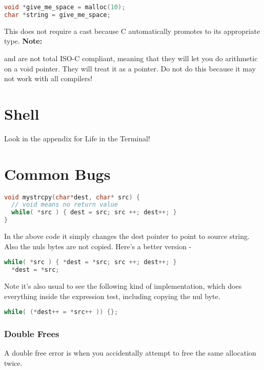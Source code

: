 \begin{lstlisting}[language=C]
void *give_me_space = malloc(10);
char *string = give_me_space;
\end{lstlisting}

This does not require a cast because C automatically promotes  to its appropriate type. \textbf{Note:}

 and  are not total ISO-C compliant, meaning that they will let you do arithmetic on a void pointer. They will treat it as a  pointer. Do not do this because it may not work with all compilers!

\section{Shell}

Look in the appendix for Life in the Terminal!

\section{Common Bugs}

\begin{lstlisting}[language=C]
void mystrcpy(char*dest, char* src) { 
  // void means no return value   
  while( *src ) { dest = src; src ++; dest++; }  
}
\end{lstlisting}

In the above code it simply changes the dest pointer to point to source string. Also the nuls bytes are not copied. Here's a better version -

\begin{lstlisting}[language=C]
  while( *src ) { *dest = *src; src ++; dest++; } 
  *dest = *src;
\end{lstlisting}

Note it's also usual to see the following kind of implementation, which
does everything inside the expression test, including copying the nul
byte.

\begin{lstlisting}[language=C]
  while( (*dest++ = *src++ )) {};
\end{lstlisting}

\subsubsection{Double Frees}

A double free error is when you accidentally attempt to free the same allocation twice.

